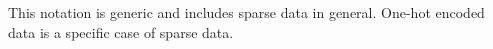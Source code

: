 This notation is generic and includes sparse data in general. One-hot encoded data is a specific case of sparse data.















